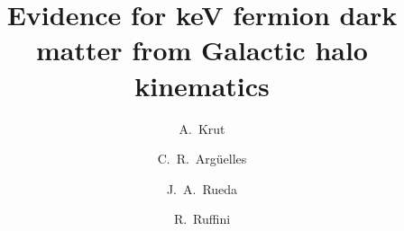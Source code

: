 \title{Evidence for keV fermion dark matter from Galactic halo kinematics}
	

\author[icranet,icra,nice]{A.~Krut}
%
\author[cct,icranet]{C.~R.~Argüelles}
%
\author[icranet,icra,cbpf]{J.~A.~Rueda}
%
\author[icranet,icra,cbpf]{R.~Ruffini}

\address[cct]{Instituto de Astrofísica de La Plata (CCT La Plata, CONICET, UNLP), Paseo del Bosque, B1900FWA La Plata, Argentina}
\address[icranet]{ICRANet, Piazza della Repubblica 10, I--65122 Pescara, Italy}
\address[icra]{Dipartimento di Fisica and ICRA, Sapienza Università di Roma, P.le Aldo Moro 5, I--00185 Rome, Italy}
\address[nice]{University of Nice-Sophia Antipolis, 28 Av. de Valrose, 06103 Nice Cedex 2, France}
\address[cbpf]{ICRANet-Rio, CBPF, Rua Dr.~Xavier Sigaud 150, Rio de Janeiro, RJ, 22290--180, Brazil}




